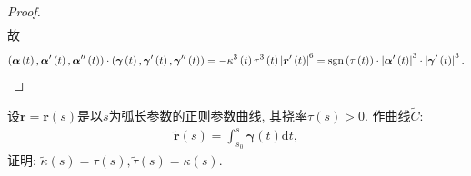 \documentclass[../../main.tex]{subfiles}%
\begin{document}
\begin{proof}
\begin{align*}
\end{align*}
故
\begin{align*}
\left(\bm{\alpha}\left(t\right),\bm{\alpha}^\prime\left(t\right),\bm{\alpha}^{\prime\prime}\left(t\right)\right)\cdot\left(\bm{\gamma}\left(t\right),\bm{\gamma}^\prime\left(t\right),\bm{\gamma}^{\prime\prime}\left(t\right)\right)=-\kappa^3\left(t\right)\tau^3\left(t\right)\left|\bm{r}^\prime\left(t\right)\right|^6=\operatorname{sgn}\left(\tau\left(t\right)\right)\cdot\left|\bm{\alpha}^\prime\left(t\right)\right|^3\cdot\left|\bm{\gamma}^\prime\left(t\right)\right|^3.
\end{align*}

\end{proof}

\begin{example}
设$\bm{r} = \bm{r}(s)$是以$s$为弧长参数的正则参数曲线, 其挠率$\tau(s) > 0$. 作曲线$\tilde{C}$:
\begin{align*}
\tilde{\bm{r}}(s) = \int_{s_0}^{s} \bm{\gamma}(t)\mathrm{d}t,
\end{align*}
证明: $\tilde{\kappa}(s) = \tau(s), \tilde{\tau}(s) = \kappa(s)$.
\end{example}
\end{document}
